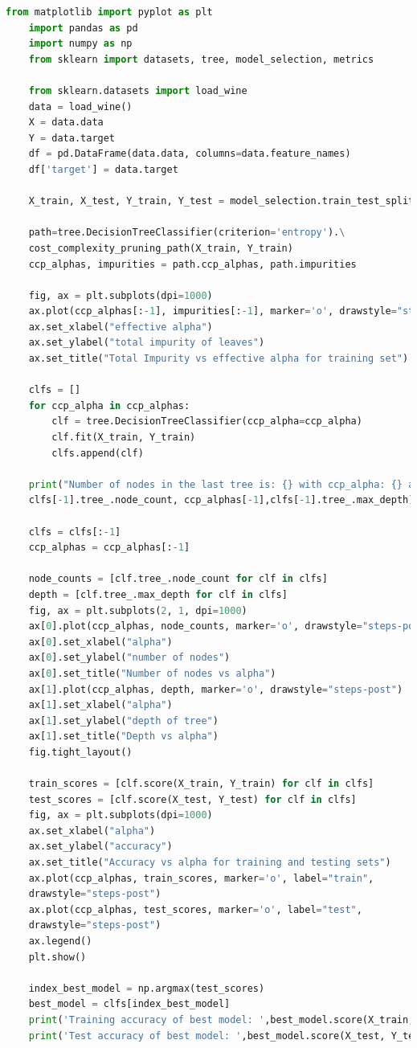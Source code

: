 \documentclass[12pt]{article}
\begin{document}
\begin{lstlisting}[language=python]
	from matplotlib import pyplot as plt
	import pandas as pd
	import numpy as np
	from sklearn import datasets, tree, model_selection, metrics
	
	from sklearn.datasets import load_wine
	data = load_wine()
	X = data.data
	Y = data.target
	df = pd.DataFrame(data.data, columns=data.feature_names)
	df['target'] = data.target
	
	X_train, X_test, Y_train, Y_test = model_selection.train_test_split(df[data.feature_names], df['target'], test_size = 0.1)
	
	path=tree.DecisionTreeClassifier(criterion='entropy').\
	cost_complexity_pruning_path(X_train, Y_train)
	ccp_alphas, impurities = path.ccp_alphas, path.impurities
	
	fig, ax = plt.subplots(dpi=1000)
	ax.plot(ccp_alphas[:-1], impurities[:-1], marker='o', drawstyle="steps-post")
	ax.set_xlabel("effective alpha")
	ax.set_ylabel("total impurity of leaves")
	ax.set_title("Total Impurity vs effective alpha for training set")
	
	clfs = []
	for ccp_alpha in ccp_alphas:
		clf = tree.DecisionTreeClassifier(ccp_alpha=ccp_alpha)
		clf.fit(X_train, Y_train)
		clfs.append(clf)
	
	print("Number of nodes in the last tree is: {} with ccp_alpha: {} and a depth of: {}".format(
	clfs[-1].tree_.node_count, ccp_alphas[-1],clfs[-1].tree_.max_depth))
	
	clfs = clfs[:-1]
	ccp_alphas = ccp_alphas[:-1]
	
	node_counts = [clf.tree_.node_count for clf in clfs]
	depth = [clf.tree_.max_depth for clf in clfs]
	fig, ax = plt.subplots(2, 1, dpi=1000)
	ax[0].plot(ccp_alphas, node_counts, marker='o', drawstyle="steps-post")
	ax[0].set_xlabel("alpha")
	ax[0].set_ylabel("number of nodes")
	ax[0].set_title("Number of nodes vs alpha")
	ax[1].plot(ccp_alphas, depth, marker='o', drawstyle="steps-post")
	ax[1].set_xlabel("alpha")
	ax[1].set_ylabel("depth of tree")
	ax[1].set_title("Depth vs alpha")
	fig.tight_layout()
	
	train_scores = [clf.score(X_train, Y_train) for clf in clfs]
	test_scores = [clf.score(X_test, Y_test) for clf in clfs]
	fig, ax = plt.subplots(dpi=1000)
	ax.set_xlabel("alpha")
	ax.set_ylabel("accuracy")
	ax.set_title("Accuracy vs alpha for training and testing sets")
	ax.plot(ccp_alphas, train_scores, marker='o', label="train",
	drawstyle="steps-post")
	ax.plot(ccp_alphas, test_scores, marker='o', label="test",
	drawstyle="steps-post")
	ax.legend()
	plt.show()
	
	index_best_model = np.argmax(test_scores)
	best_model = clfs[index_best_model]
	print('Training accuracy of best model: ',best_model.score(X_train, Y_train))
	print('Test accuracy of best model: ',best_model.score(X_test, Y_test))
\end{lstlisting}
\end{document}
